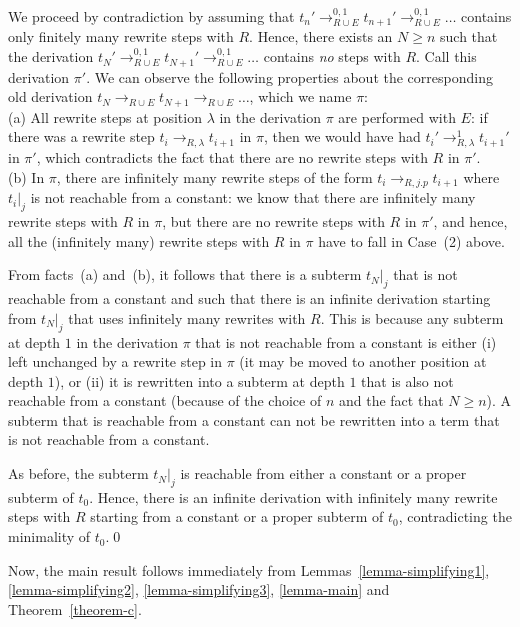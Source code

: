 \documentclass{LMCS}
\theoremstyle{plain}
\begin{document}
We proceed by contradiction
by assuming that
$t_n'\rightarrow_{R\cup E}^{0,1} t_{n+1}'\rightarrow_{R\cup
E}^{0,1}\ldots$ contains only finitely many rewrite steps
with $R$.  Hence, there exists an $N\geq n$ such that
the derivation
$t_N'\rightarrow_{R\cup E}^{0,1} t_{N+1}'\rightarrow_{R\cup
E}^{0,1}\ldots$ contains {\em{no}} steps with $R$.
Call this derivation $\pi'$.
We can observe the following properties about the
corresponding old derivation
$t_N\rightarrow_{R\cup E} t_{N+1}\rightarrow_{R\cup
E}\ldots$, which we name $\pi$:
\\
(a) All rewrite steps at position $\lambda$ in 
the derivation $\pi$ are performed with $E$:  
if there was a rewrite step 
$t_{i}\to_{R,\lambda} t_{i+1}$ in $\pi$, then
we would have had 
$t_{i}'\to_{R,\lambda}^{1} t_{i+1}'$ in $\pi'$, which 
contradicts the fact that there are no rewrite steps 
with $R$ in $\pi'$.
\\
(b) In $\pi$, there are infinitely many rewrite steps of
the form $t_{i}\to_{R,j.p}t_{i+1}$ where $t_i|_j$ is
not reachable from a constant:
we know that there are infinitely many rewrite steps with $R$
in $\pi$, but there are no rewrite steps with $R$ in $\pi'$,
and hence, all the (infinitely many) rewrite steps with $R$
in $\pi$ have to fall in Case~(2) above.

From facts~(a) and~(b), it follows that there is a subterm
$t_N|_{j}$ that is not reachable from a constant and
such that there is an infinite derivation
starting from $t_N|_j$ that uses infinitely many rewrites with $R$. 
This is because any subterm at depth $1$ in the derivation $\pi$
that is not reachable from a constant is either
(i) left unchanged by a rewrite step in $\pi$ (it may be moved to
another position at depth $1$), or
(ii) it is rewritten into a subterm at depth $1$ that is also not
reachable from a constant (because of the choice of $n$ and the fact
that $N\geq n$). A subterm that is reachable from a constant can not
be rewritten into a term that is not reachable from a constant.

As before, the subterm $t_N|_j$ is reachable
from either a constant or a proper subterm of $t_0$.
Hence, there is an infinite derivation with infinitely
many rewrite steps with $R$ starting from a constant or
a proper subterm of $t_0$, contradicting the
minimality of $t_0$.\qed 





Now, the main result follows immediately
from Lemmas~\ref{lemma-simplifying1}, \ref{lemma-simplifying2},
\ref{lemma-simplifying3}, \ref{lemma-main} and 
Theorem~\ref{theorem-c}.
\end{document}
